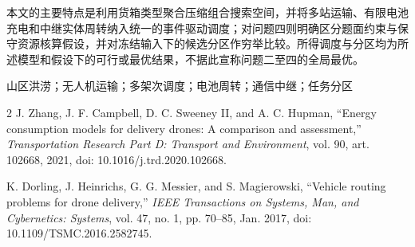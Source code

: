 \documentclass[UTF8,a4paper,zihao=-4]{ctexart}
\begin{document}
本文的主要特点是利用货箱类型聚合压缩组合搜索空间，并将多站运输、有限电池充电和中继实体周转纳入统一的事件驱动调度；对问题四则明确区分题面约束与保守资源核算假设，并对冻结输入下的候选分区作穷举比较。所得调度与分区均为所述模型和假设下的可行或最优结果，不据此宣称问题二至四的全局最优。

\vspace{0.6em}
山区洪涝；无人机运输；多架次调度；电池周转；通信中继；任务分区
\clearpage






\begin{thebibliography}{2}
J. Zhang, J. F. Campbell, D. C. Sweeney II, and A. C. Hupman,
``Energy consumption models for delivery drones: A comparison and assessment,''
\textit{Transportation Research Part D: Transport and Environment}, vol. 90,
art. 102668, 2021, doi: 10.1016/j.trd.2020.102668.

K. Dorling, J. Heinrichs, G. G. Messier, and S. Magierowski,
``Vehicle routing problems for drone delivery,''
\textit{IEEE Transactions on Systems, Man, and Cybernetics: Systems}, vol. 47,
no. 1, pp. 70--85, Jan. 2017, doi: 10.1109/TSMC.2016.2582745.
\end{thebibliography}
\end{document}
